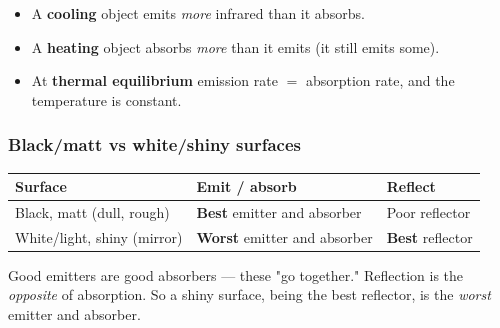 \documentclass[11pt,a4paper]{article}
\begin{document}
\begin{center}
\end{center}

\begin{itemize}[leftmargin=1.4em,itemsep=1pt]
  \item A \textbf{cooling} object emits \emph{more} infrared than it absorbs.
  \item A \textbf{heating} object absorbs \emph{more} than it emits (it still emits some).
  \item At \textbf{thermal equilibrium} emission rate $=$ absorption rate, and the
        temperature is constant.
\end{itemize}

\subsubsection{Black/matt vs white/shiny surfaces}

\begin{keybox}
\begin{center}
\renewcommand{\arraystretch}{1.3}
\begin{tabular}{@{}p{4.5cm}p{4.7cm}p{4.7cm}@{}}
\toprule
\textbf{Surface} & \textbf{Emit / absorb} & \textbf{Reflect} \\
\midrule
Black, matt (dull, rough) & \textbf{Best} emitter and absorber & Poor reflector \\
White/light, shiny (mirror) & \textbf{Worst} emitter and absorber & \textbf{Best} reflector \\
\bottomrule
\end{tabular}
\end{center}
Good emitters are good absorbers --- these "go together." Reflection is the
\emph{opposite} of absorption. So a shiny surface, being the best reflector, is the
\emph{worst} emitter and absorber.
\end{keybox}
\end{document}
